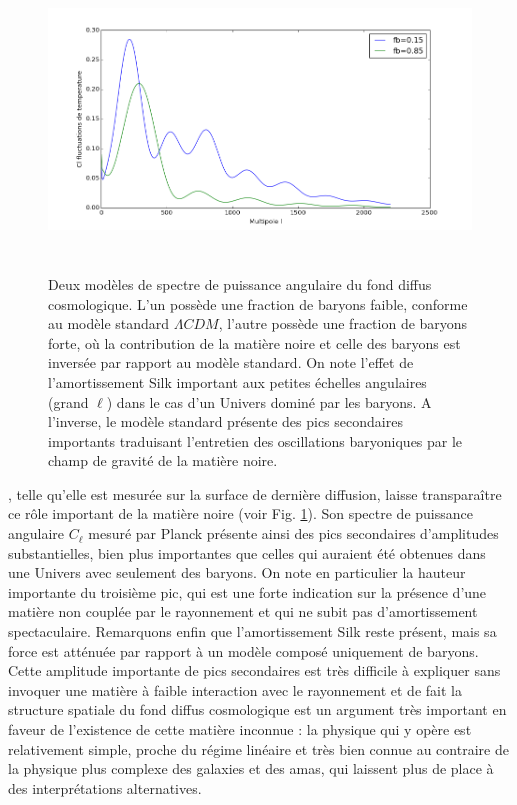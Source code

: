 \begin{figure}[htbp]
	\centering
		\includegraphics[height=8cm]{figs/cl_silk.png}
	\caption[Deux modèles de spectre de puissance angulaire du fond diffus cosmologique]{Deux modèles de spectre de puissance angulaire du fond diffus cosmologique. L'un possède une fraction de baryons faible, conforme au modèle standard $\Lambda CDM$, l'autre possède une fraction de baryons forte, où la contribution de la matière noire et celle des baryons est inversée par rapport au modèle standard. On note l'effet de l'amortissement Silk important aux petites échelles angulaires (grand $\ell$) dans le cas d'un Univers dominé par les baryons. A l'inverse, le modèle standard présente des pics secondaires importants traduisant l'entretien des oscillations baryoniques par le champ de gravité de la matière noire.} 
	\label{f:cl_silk}
\end{figure}

, telle qu'elle est mesurée sur la surface de dernière diffusion, laisse transparaître ce rôle important de la matière noire (voir Fig. \ref{f:cl_silk}). Son spectre de puissance angulaire $C_\ell$ mesuré par Planck présente ainsi des pics secondaires d'amplitudes substantielles, bien plus importantes que celles qui auraient été obtenues dans une Univers avec seulement des baryons. On note en particulier la hauteur importante du troisième pic, qui est une forte indication sur la présence d'une matière non couplée par le rayonnement et qui ne subit pas d'amortissement spectaculaire. Remarquons enfin que l'amortissement Silk reste présent, mais sa force est atténuée par rapport à un modèle composé uniquement de baryons. Cette amplitude importante de pics secondaires est très difficile à expliquer sans invoquer une matière à faible interaction avec le rayonnement et de fait la structure spatiale du fond diffus cosmologique est un argument très important en faveur de l'existence de cette matière inconnue : la physique qui y opère est relativement simple, proche du régime linéaire et très bien connue au contraire de la physique plus complexe des galaxies et des amas, qui laissent plus de place à des interprétations alternatives.

